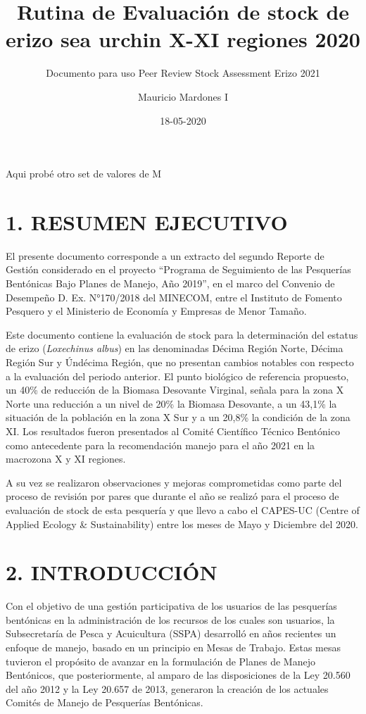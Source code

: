 \documentclass[
]{article}
\title{Rutina de Evaluación de stock de erizo sea urchin X-XI regiones
2020}
\subtitle{Documento para uso Peer Review Stock Assessment Erizo 2021}
\author{Mauricio Mardones I}
\date{18-05-2020}
\begin{document}
\maketitle

{
\setcounter{tocdepth}{3}
\tableofcontents
}
Aqui probé otro set de valores de M

\hypertarget{resumen-ejecutivo}{%
\section{1. RESUMEN EJECUTIVO}\label{resumen-ejecutivo}}

El presente documento corresponde a un extracto del segundo Reporte de
Gestión considerado en el proyecto ``Programa de Seguimiento de las
Pesquerías Bentónicas Bajo Planes de Manejo, Año 2019'', en el marco del
Convenio de Desempeño D. Ex. N°170/2018 del MINECOM, entre el Instituto
de Fomento Pesquero y el Ministerio de Economía y Empresas de Menor
Tamaño.

Este documento contiene la evaluación de stock para la determinación del
estatus de erizo (\emph{Loxechinus albus}) en las denominadas Décima
Región Norte, Décima Región Sur y Úndécima Región, que no presentan
cambios notables con respecto a la evaluación del periodo anterior. El
punto biológico de referencia propuesto, un 40\% de reducción de la
Biomasa Desovante Virginal, señala para la zona X Norte una reducción a
un nivel de 20\% la Biomasa Desovante, a un 43,1\% la situación de la
población en la zona X Sur y a un 20,8\% la condición de la zona XI. Los
resultados fueron presentados al Comité Científico Técnico Bentónico
como antecedente para la recomendación manejo para el año 2021 en la
macrozona X y XI regiones.

A su vez se realizaron observaciones y mejoras comprometidas como parte
del proceso de revisión por pares que durante el año se realizó para el
proceso de evaluación de stock de esta pesquería y que llevo a cabo el
CAPES-UC (Centre of Applied Ecology \& Sustainability) entre los meses
de Mayo y Diciembre del 2020.

\pagebreak

\hypertarget{introducciuxf3n}{%
\section{2. INTRODUCCIÓN}\label{introducciuxf3n}}

Con el objetivo de una gestión participativa de los usuarios de las
pesquerías bentónicas en la administración de los recursos de los cuales
son usuarios, la Subsecretaría de Pesca y Acuicultura (SSPA) desarrolló
en años recientes un enfoque de manejo, basado en un principio en Mesas
de Trabajo. Estas mesas tuvieron el propósito de avanzar en la
formulación de Planes de Manejo Bentónicos, que posteriormente, al
amparo de las disposiciones de la Ley 20.560 del año 2012 y la Ley
20.657 de 2013, generaron la creación de los actuales Comités de Manejo
de Pesquerías Bentónicas.
\end{document}

